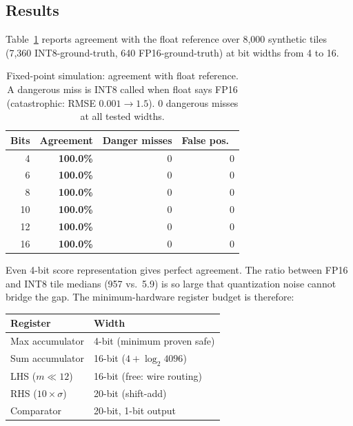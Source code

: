 \documentclass[10pt,twocolumn]{article}
\begin{document}
\subsection{Results}

Table~\ref{tab:fixedpoint} reports agreement with the float reference
over 8{,}000 synthetic tiles (7{,}360 INT8-ground-truth, 640
FP16-ground-truth) at bit widths from 4 to 16.

\begin{table}[tbp]
\centering
\caption{Fixed-point simulation: agreement with float reference.
  A dangerous miss is INT8 called when float says FP16
  (catastrophic: RMSE $0.001 \to 1.5$). 0 dangerous misses
  at all tested widths.}
\label{tab:fixedpoint}
\small
\begin{tabular}{rrrr}
\toprule
Bits & Agreement & Danger misses & False pos.\ \\
\midrule
 4 & \textbf{100.0\%} & 0 & 0 \\
 6 & \textbf{100.0\%} & 0 & 0 \\
 8 & \textbf{100.0\%} & 0 & 0 \\
10 & \textbf{100.0\%} & 0 & 0 \\
12 & \textbf{100.0\%} & 0 & 0 \\
16 & \textbf{100.0\%} & 0 & 0 \\
\bottomrule
\end{tabular}
\end{table}

Even 4-bit score representation gives perfect agreement. The ratio
between FP16 and INT8 tile medians (957 vs.\ 5.9) is so large that
quantization noise cannot bridge the gap. The minimum-hardware
register budget is therefore:

\begin{center}
\small
\begin{tabular}{ll}
\toprule
Register & Width \\
\midrule
Max accumulator & 4-bit (minimum proven safe) \\
Sum accumulator & 16-bit ($4 + \log_2 4096$) \\
LHS ($m \ll 12$) & 16-bit (free: wire routing) \\
RHS ($10\times\sigma$) & 20-bit (shift-add) \\
Comparator & 20-bit, 1-bit output \\
\bottomrule
\end{tabular}
\end{center}

\end{document}
